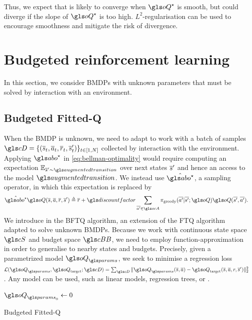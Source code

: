 Thus, we expect that  is likely to converge when $\oQ^{\star}$ is smooth, but could diverge if the slope of $\oQ^{\star}$ is too high.  $L^2$-regularisation can be used to encourage smoothness and mitigate the risk of divergence.


\section{Budgeted reinforcement learning}

\label{sec:brl}

In this section, we consider \glspl{BMDP} with unknown parameters that must be solved by interaction with an environment. 

\subsection{Budgeted Fitted-Q}
\label{subsec:bftq}

When the \gls{BMDP} is unknown, we need to adapt  to work with a batch of samples $\cD=\{(\os_t,\oa_t,\overline{r}_t,\os_t')\}_{t\in [1,N]}$ collected by interaction with the environment. Applying $\abo^{\star}$ in \eqref{eq:bellman-optimality} would require computing an expectation $\expectedvalue_{\os'\sim \augmentedtransition}$ over next states $\overline{s}'$ and hence an access to the model $\augmentedtransition$. We instead use $\hat{\abo^{\star}}$, a sampling operator, in which this expectation is replaced by
\begin{equation*}
\hat{\abo^{\star}} \oQ(\os, \oa, \overline{r}, \os') \eqdef \overline{r} + \discount \sum_{\ov{a'}\in \ocA} \pi_\text{greedy}(\ov{a'}|\ov{s'}; \oQ) \oQ(\ov{s'}, \ov{a'}).
\end{equation*}
We introduce in  the \gls{BFTQ} algorithm, an extension of the \gls{FTQ} algorithm adapted to solve unknown \glspl{BMDP}. Because we work with continuous state space $\cS$ and budget space $\budgetspace$, we need to employ function-approximation in order to generalise to nearby states and budgets. Precisely, given a parametrized model $\oQ_\params$, we seek to minimise a regression loss $\cL(\oQ_\params, \oQ_\text{target};\cD) = \sum_{\cD} \|\oQ_\params(\os, \oa) - \oQ_\text{target}(\os, \oa, r, \os')\|_2^2$.
Any model can be used, such as linear models, regression trees, or .

\begin{algorithm}[ht]
	\DontPrintSemicolon
	\KwData{$\cD$}
	$\oQ_{\params_0} \leftarrow 0$\;
	\caption{Budgeted Fitted-Q}
	\label{alg:bftq}
\end{algorithm}

